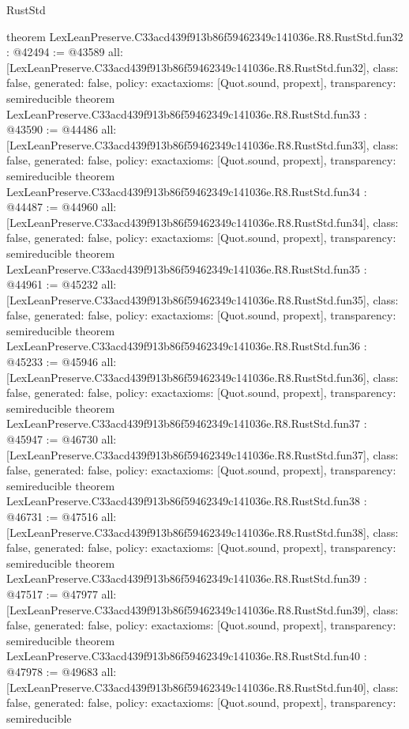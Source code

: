 \begin{lexlean}{RustStd}
\begin{coremodule}
{}
theorem LexLeanPreserve.C33acd439f913b86f59462349c141036e.R8.RustStd.fun32 : @42494 := @43589 {
  all: [LexLeanPreserve.C33acd439f913b86f59462349c141036e.R8.RustStd.fun32],
  class: false,
  generated: false,
  policy: exact{axioms: [Quot.sound, propext]},
  transparency: semireducible
}
theorem LexLeanPreserve.C33acd439f913b86f59462349c141036e.R8.RustStd.fun33 : @43590 := @44486 {
  all: [LexLeanPreserve.C33acd439f913b86f59462349c141036e.R8.RustStd.fun33],
  class: false,
  generated: false,
  policy: exact{axioms: [Quot.sound, propext]},
  transparency: semireducible
}
theorem LexLeanPreserve.C33acd439f913b86f59462349c141036e.R8.RustStd.fun34 : @44487 := @44960 {
  all: [LexLeanPreserve.C33acd439f913b86f59462349c141036e.R8.RustStd.fun34],
  class: false,
  generated: false,
  policy: exact{axioms: [Quot.sound, propext]},
  transparency: semireducible
}
theorem LexLeanPreserve.C33acd439f913b86f59462349c141036e.R8.RustStd.fun35 : @44961 := @45232 {
  all: [LexLeanPreserve.C33acd439f913b86f59462349c141036e.R8.RustStd.fun35],
  class: false,
  generated: false,
  policy: exact{axioms: [Quot.sound, propext]},
  transparency: semireducible
}
theorem LexLeanPreserve.C33acd439f913b86f59462349c141036e.R8.RustStd.fun36 : @45233 := @45946 {
  all: [LexLeanPreserve.C33acd439f913b86f59462349c141036e.R8.RustStd.fun36],
  class: false,
  generated: false,
  policy: exact{axioms: [Quot.sound, propext]},
  transparency: semireducible
}
theorem LexLeanPreserve.C33acd439f913b86f59462349c141036e.R8.RustStd.fun37 : @45947 := @46730 {
  all: [LexLeanPreserve.C33acd439f913b86f59462349c141036e.R8.RustStd.fun37],
  class: false,
  generated: false,
  policy: exact{axioms: [Quot.sound, propext]},
  transparency: semireducible
}
theorem LexLeanPreserve.C33acd439f913b86f59462349c141036e.R8.RustStd.fun38 : @46731 := @47516 {
  all: [LexLeanPreserve.C33acd439f913b86f59462349c141036e.R8.RustStd.fun38],
  class: false,
  generated: false,
  policy: exact{axioms: [Quot.sound, propext]},
  transparency: semireducible
}
theorem LexLeanPreserve.C33acd439f913b86f59462349c141036e.R8.RustStd.fun39 : @47517 := @47977 {
  all: [LexLeanPreserve.C33acd439f913b86f59462349c141036e.R8.RustStd.fun39],
  class: false,
  generated: false,
  policy: exact{axioms: [Quot.sound, propext]},
  transparency: semireducible
}
theorem LexLeanPreserve.C33acd439f913b86f59462349c141036e.R8.RustStd.fun40 : @47978 := @49683 {
  all: [LexLeanPreserve.C33acd439f913b86f59462349c141036e.R8.RustStd.fun40],
  class: false,
  generated: false,
  policy: exact{axioms: [Quot.sound, propext]},
  transparency: semireducible
}
\end{coremodule}
\end{lexlean}
